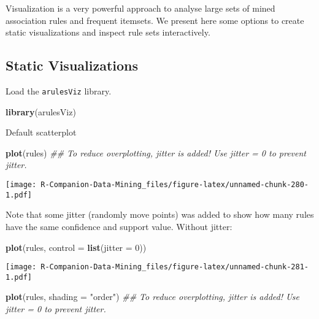 \documentclass[
  notitlepage]{book}
\newenvironment{Shaded}{\begin{snugshade}}{\end{snugshade}}
\newcommand{\CommentTok}[1]{\textcolor[rgb]{0.56,0.35,0.01}{\textit{#1}}}
\newcommand{\DataTypeTok}[1]{\textcolor[rgb]{0.13,0.29,0.53}{#1}}
\newcommand{\DecValTok}[1]{\textcolor[rgb]{0.00,0.00,0.81}{#1}}
\newcommand{\KeywordTok}[1]{\textcolor[rgb]{0.13,0.29,0.53}{\textbf{#1}}}
\newcommand{\NormalTok}[1]{#1}
\newcommand{\StringTok}[1]{\textcolor[rgb]{0.31,0.60,0.02}{#1}}
\begin{document}
Visualization is a very powerful approach to analyse large sets of
mined association rules and frequent itemsets. We present here some options
to create static visualizations and inspect rule sets interactively.

\hypertarget{static-visualizations}{%
\subsection{Static Visualizations}\label{static-visualizations}}

Load the \texttt{arulesViz} library.

\begin{Shaded}
\begin{Highlighting}[]
\KeywordTok{library}\NormalTok{(arulesViz)}
\end{Highlighting}
\end{Shaded}

Default scatterplot

\begin{Shaded}
\begin{Highlighting}[]
\KeywordTok{plot}\NormalTok{(rules)}
\CommentTok{\#\# To reduce overplotting, jitter is added! Use jitter = 0 to prevent jitter.}
\end{Highlighting}
\end{Shaded}

\texttt{[image: R-Companion-Data-Mining\_files/figure-latex/unnamed-chunk-280-1.pdf]}

Note that some jitter (randomly move points) was added to show how many
rules have the same confidence and support value. Without jitter:

\begin{Shaded}
\begin{Highlighting}[]
\KeywordTok{plot}\NormalTok{(rules, }\DataTypeTok{control =} \KeywordTok{list}\NormalTok{(}\DataTypeTok{jitter =} \DecValTok{0}\NormalTok{))}
\end{Highlighting}
\end{Shaded}

\texttt{[image: R-Companion-Data-Mining\_files/figure-latex/unnamed-chunk-281-1.pdf]}

\begin{Shaded}
\begin{Highlighting}[]
\KeywordTok{plot}\NormalTok{(rules, }\DataTypeTok{shading =} \StringTok{"order"}\NormalTok{)}
\CommentTok{\#\# To reduce overplotting, jitter is added! Use jitter = 0 to prevent jitter.}
\end{Highlighting}
\end{Shaded}
\end{document}
